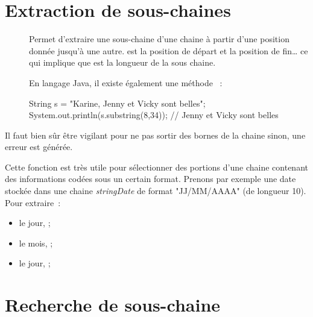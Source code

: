 \section{Extraction de sous-chaines}

	\begin{description}
	\item[]
		
		Permet d’extraire une sous-chaine d'une chaine à partir d'une position
		donnée jusqu'à une autre.  est la position de départ et
		 la position de fin… ce qui implique que  est la longueur de la sous chaine. 

		En langage Java, il existe également une méthode ~:

		\begin{java}
String s = "Karine, Jenny et Vicky sont belles";			
System.out.println(s.substring(8,34)); 
	// Jenny et Vicky sont belles
		\end{java}
	
	\end{description}

	Il faut bien sûr être vigilant pour ne pas sortir des bornes de la chaine
	sinon, une erreur est générée. 

	Cette fonction est très utile pour sélectionner des portions d’une chaine
	contenant des informations codées sous un certain format.  Prenons par
	exemple une date stockée dans une chaine \textit{stringDate} de format 
	"JJ/MM/AAAA" (de longueur 10).  Pour extraire~:
	
	\begin{itemize}
		\item le jour, ;
		\item le mois, ;
		\item le jour, ;
	\end{itemize}

	
\clearpage
\section{Recherche de sous-chaine}
	
